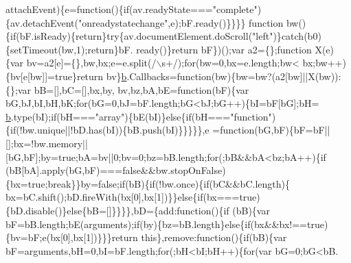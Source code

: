 \begin{DoxyCode}
      attachEvent)\{e=\textcolor{keyword}{function}()\{\textcolor{keywordflow}{if}(av.readyState===\textcolor{stringliteral}{"complete"})\{av.detachEvent(\textcolor{stringliteral}{"onreadystatechange"},e);bF.ready()\}\}\}\}\textcolor{keyword}{
      function} bw()\{\textcolor{keywordflow}{if}(bF.isReady)\{\textcolor{keywordflow}{return}\}\textcolor{keywordflow}{try}\{av.documentElement.doScroll(\textcolor{stringliteral}{"left"})\}\textcolor{keywordflow}{catch}(b0)\{setTimeout(bw,1);\textcolor{keywordflow}{return}\}bF.
      ready()\}\textcolor{keywordflow}{return} bF\})();var a2=\{\};\textcolor{keyword}{function} X(e)\{var bv=a2[e]=\{\},bw,bx;e=e.split(/\(\backslash\)s+/);\textcolor{keywordflow}{for}(bw=0,bx=e.length;bw<
      bx;bw++)\{bv[e[bw]]=\textcolor{keyword}{true}\}\textcolor{keywordflow}{return} bv\}\hyperlink{a00039_aa4026ad5544b958e54ce5e106fa1c805}{b}.Callbacks=\textcolor{keyword}{function}(bw)\{bw=bw?(a2[bw]||X(bw)):\{\};var bB=[],bC=[],bx,by,
      bv,bz,bA,bE=\textcolor{keyword}{function}(bF)\{var bG,bJ,bI,bH,bK;\textcolor{keywordflow}{for}(bG=0,bJ=bF.length;bG<bJ;bG++)\{bI=bF[bG];bH=
      \hyperlink{a00039_aa4026ad5544b958e54ce5e106fa1c805}{b}.type(bI);\textcolor{keywordflow}{if}(bH===\textcolor{stringliteral}{"array"})\{bE(bI)\}\textcolor{keywordflow}{else}\{\textcolor{keywordflow}{if}(bH===\textcolor{stringliteral}{"function"})\{\textcolor{keywordflow}{if}(!bw.unique||!bD.has(bI))\{bB.push(bI)\}\}\}\}\},e
      =\textcolor{keyword}{function}(bG,bF)\{bF=bF||[];bx=!bw.memory||[bG,bF];by=\textcolor{keyword}{true};bA=bv||0;bv=0;bz=bB.length;\textcolor{keywordflow}{for}(;bB&&bA<bz;bA++)\{\textcolor{keywordflow}{if}
      (bB[bA].apply(bG,bF)===\textcolor{keyword}{false}&&bw.stopOnFalse)\{bx=\textcolor{keyword}{true};\textcolor{keywordflow}{break}\}\}by=\textcolor{keyword}{false};\textcolor{keywordflow}{if}(bB)\{\textcolor{keywordflow}{if}(!bw.once)\{\textcolor{keywordflow}{if}(bC&&bC.length)\{
      bx=bC.shift();bD.fireWith(bx[0],bx[1])\}\}\textcolor{keywordflow}{else}\{\textcolor{keywordflow}{if}(bx===\textcolor{keyword}{true})\{bD.disable()\}\textcolor{keywordflow}{else}\{bB=[]\}\}\}\},bD=\{add:\textcolor{keyword}{function}()\{\textcolor{keywordflow}{if}
      (bB)\{var bF=bB.length;bE(arguments);\textcolor{keywordflow}{if}(by)\{bz=bB.length\}\textcolor{keywordflow}{else}\{\textcolor{keywordflow}{if}(bx&&bx!==\textcolor{keyword}{true})\{bv=bF;e(bx[0],bx[1])\}\}\}\textcolor{keywordflow}{return}
       \textcolor{keyword}{this}\},\textcolor{keyword}{remove}:\textcolor{keyword}{function}()\{\textcolor{keywordflow}{if}(bB)\{var bF=arguments,bH=0,bI=bF.length;\textcolor{keywordflow}{for}(;bH<bI;bH++)\{\textcolor{keywordflow}{for}(var bG=0;bG<bB.

\end{DoxyCode}
